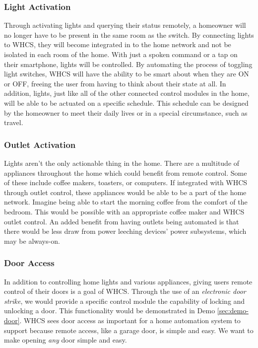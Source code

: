 \subsubsection{Light Activation}
Through activating lights and querying their status remotely, a homeowner will
no longer have to be present in the same room as the switch.  By connecting
lights to WHCS, they will become integrated in to the home network and not be
isolated in each room of the home.  With just a spoken command or a tap on
their smartphone, lights will be controlled.  By automating the process of
toggling light switches, WHCS will have the ability to be smart about when they
are ON or OFF, freeing the user from having to think about their state at all.
In addition, lights, just like all of the other connected control modules in
the home, will be able to be actuated on a specific schedule. This schedule
can be designed by the homeowner
to meet their daily lives or in a special circumstance, such as travel.

\subsubsection{Outlet Activation}
Lights aren't the only actionable thing in the home. There are a multitude of
appliances throughout the home which could benefit from remote control. Some
of these include coffee makers, toasters, or computers.
If integrated with WHCS through outlet control, these appliances
would be able to be a part of the home network. Imagine being able to start the
morning coffee from the comfort of the bedroom. This would be possible with an
appropriate coffee maker and WHCS outlet control. An added benefit from having
outlets being automated is that there would be less draw from power leeching
devices' power subsystems, which may be always-on.

\subsubsection{Door Access}
In addition to controlling home lights and various appliances, giving users
remote control of their doors is  a goal of WHCS. Through the use of an
\emph{electronic door strike}, we would provide a specific control module the
capability of locking and unlocking a door. This functionality would be
demonstrated in Demo \ref{sec:demo-door}. WHCS sees door access as important
for a home automation system to support because remote access, like a garage
door, is simple and easy. We want to make opening \emph{any} door simple and
easy.

